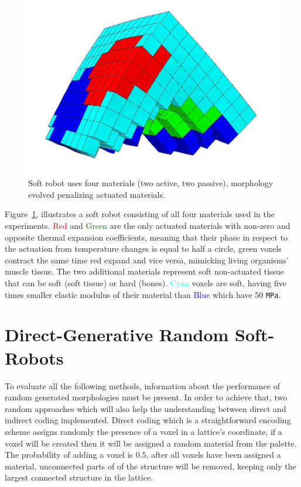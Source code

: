 \begin{figure}
\centering
\includegraphics[height=0.2\textheight]{../Figures/Misc/allSoftMaterials.png}
\caption{Soft robot uses four materials (two active, two passive), morphology evolved penalizing actuated materials.}
\label{fig:allSoftMaterials}
\end{figure}

Figure~\ref{fig:allSoftMaterials}, illustrates a soft robot consisting of all four materials used in the experiments. \textcolor{Red}{Red} and \textcolor{Green}{Green} are the only actuated materials with non-zero and opposite thermal expansion coefficients, meaning that their phase in respect to the actuation from temperature changes is equal to half a circle, green voxels contract the same time red expand and vice versa, mimicking living organisms' muscle tissue. The two additional materials represent soft non-actuated tissue that can be soft (soft tissue) or hard (bones). \textcolor{Cyan}{Cyan} voxels are soft, having five times smaller elastic modulus of their material than \textcolor{Blue}{Blue} which have $50$ \texttt{MPa}.


\section{Direct-Generative Random Soft-Robots}
To evaluate all the following methods, information about the performance of random generated morphologies must be present. In order to achieve that, two random approaches which will also help the understanding between direct and indirect coding implemented. Direct coding which is a straightforward encoding scheme assigns randomly the presence of a voxel in a lattice's coordinate, if a voxel will be created then it will be assigned a random material from the palette. The probability of adding a voxel is $0.5$, after all voxels have been assigned a material, unconnected parts of of the structure will be removed, keeping only the largest connected structure in the lattice.


